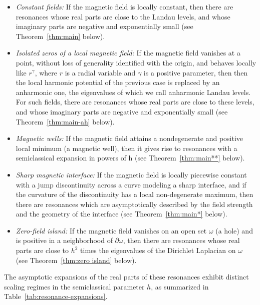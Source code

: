 \documentclass[11pt]{amsart}
\theoremstyle{remark}
\numberwithin{equation}{section}
\begin{document}
\begin{itemize}
    \item \emph{Constant fields:} If the magnetic field is locally constant, then there are resonances  whose real parts are close to the Landau levels, and whose imaginary parts are negative and exponentially small (see Theorem~\ref{thm:main} below).
    \item \emph{Isolated zeros of a local magnetic field:} If the magnetic field vanishes at a point, without loss of generality identified with the origin, and behaves locally like $r^\gamma$, where $r$ is a radial variable and $\gamma$ is a positive parameter, then then the local harmonic potential of the previous case is replaced by an anharmonic one, the eigenvalues of which we call anharmonic Landau levels. For such fields, there are resonances whose real parts are close to these levels, and whose imaginary parts are negative and exponentially small (see Theorem~\ref{thm:main-ah} below).
\item \emph{Magnetic wells:} 
If the magnetic field attains a nondegenerate and positive local minimum (a magnetic
well), then it gives rise to resonances with a semiclassical expansion in powers of h (see
Theorem~\ref{thm:main**} below).
%
\item \emph{Sharp magnetic interface:} If the magnetic
field is locally piecewise constant with a jump discontinuity across a curve modeling a sharp interface, 
and if the curvature of the discontinuity  has a local non-degenerate maximum, then there are resonances 
 which are asymptotically described by the field strength and the geometry of the interface (see Theorem~\ref{thm:main*} below).
\item \emph{Zero-field island:} If the magnetic field vanishes on an open set $\omega$ (a hole) and is positive in a neighborhood of $\partial\omega$, then there are resonances whose real parts are close to $h^2$ times the eigenvalues of the Dirichlet Laplacian on $\omega$ (see Theorem~\ref{thm:zero island} below).
\end{itemize}  

The asymptotic expansions of the real parts of these resonances exhibit distinct scaling regimes in the semiclassical parameter $h$, as summarized in Table~\ref{tab:resonance-expansions}. 
\end{document}
